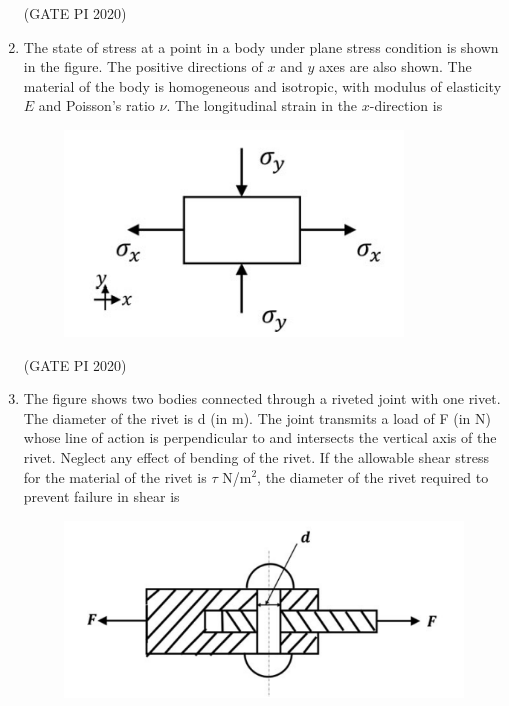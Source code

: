 \documentclass[journal,12pt,onecolumn]{IEEEtran}
\theoremstyle{remark}
\begin{document}
\begin{enumerate}
\hfill (GATE PI 2020)

\item The state of stress at a point in a body under plane stress condition is shown in the figure. The positive directions of $x$ and $y$ axes are also shown. The material of the body is homogeneous and isotropic, with modulus of elasticity $E$ and Poisson's ratio $\nu$. The longitudinal strain in the $x$\--direction is
\begin{figure}[h]
    \centering
    \includegraphics[width=0.5\columnwidth]{figs/fig8.png}
    \caption{}
    \label{fig:placeholder}
\end{figure}

\begin{enumerate}
\end{enumerate}

\hfill (GATE PI 2020)

\item The figure shows two bodies connected through a riveted joint with one rivet. The diameter of the rivet is d (in m). The joint transmits a load of F (in N) whose line of action is perpendicular to and intersects the vertical axis of the rivet. Neglect any effect of bending of the rivet. If the allowable shear stress for the material of the rivet is $\tau$ N/m$^2$, the diameter of the rivet required to prevent failure in shear is

\begin{figure}[h]
    \centering
    \includegraphics[width=0.5\columnwidth]{figs/fig9.png}
    \caption{}
    \label{fig:placeholder}
\end{figure}


\end{enumerate}
\end{document}

